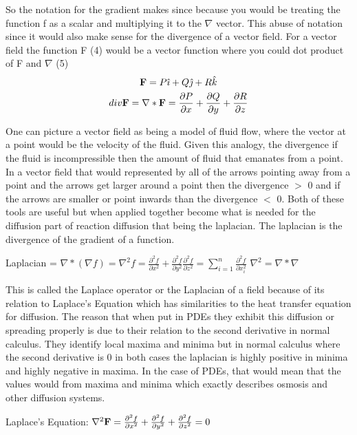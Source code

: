 \documentclass[12pt]{article}
\begin{document}
So the notation for the gradient makes since because you would be treating the function f as a scalar and
multiplying it to the $\nabla$ vector. This abuse of notation since it would also make sense for the
divergence of a vector field. For a vector field the function F (4) would be a vector function where you could
dot product of F and $\nabla$ (5) 
\begin{gather}
  \bold{F} = P\hat{\imath} + Q\hat{\jmath} + R\hat{k} \\
  div \bold{F} = \nabla * \bold{F} = \frac{\partial P}{\partial x} + \frac{\partial Q}{\partial y} + \frac{\partial R}{\partial z} 
\end{gather}

One can picture a vector field as being a model of fluid flow, where the vector at a point would be the
velocity of the fluid. Given this analogy, the divergence if the fluid is incompressible then the amount of
fluid that emanates from a point. In a vector field that would represented by all of the arrows pointing away
from a point and the arrows get larger around a point then the divergence $>$ 0 and if the arrows are smaller
or point inwards than the divergence $<$ 0. Both of these tools are useful but when applied together become
what is needed for the diffusion part of reaction diffusion that being the laplacian. The laplacian is the
divergence of the gradient of a function.

\begin{center}
Laplacian = $\nabla * (\nabla f) = \nabla^2 f = \frac{\partial^2 f}{\partial x^2} + \frac{\partial^2
f}{\partial y^2} \frac{\partial^2 f}{\partial z^2} = \sum_{i=1}^{n} \frac{\partial^2 f}{\partial x_i^2}$ \quad
$\nabla^2 = \nabla * \nabla$
\end{center}

This is called the Laplace operator or the Laplacian of a field because of its relation to Laplace's
Equation which has similarities to the heat transfer equation for diffusion. The reason that when put in
PDEs they exhibit this diffusion or spreading properly is due to their relation to the second derivative in
normal calculus. They identify local maxima and minima but in normal calculus where the second derivative is
0 in both cases the laplacian is highly positive in minima and highly negative in maxima. In the case of
PDEs, that would mean that the values would  from maxima and  minima which exactly
describes osmosis and other diffusion systems.

\begin{center}
Laplace's Equation: $\nabla^2 \bold{F} = \frac{\partial^2 f}{\partial x^2} + \frac{\partial^2 f}{\partial
y^2} + \frac{\partial^2 f}{\partial z^2} = 0$
\end{center}
\end{document}
